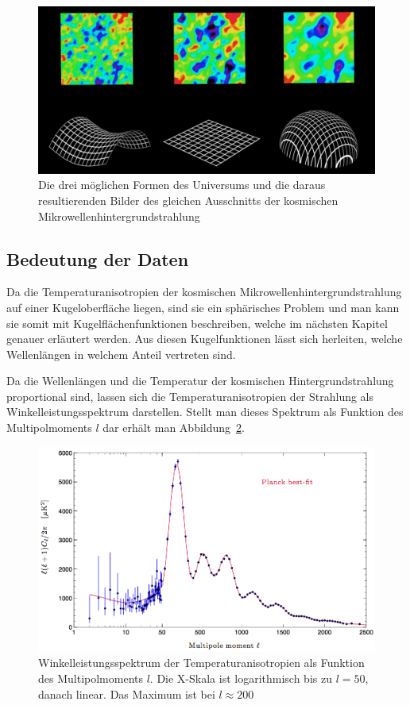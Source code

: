 \begin{figure}
	\includegraphics[width=\linewidth]{cmb/images/universe_shapes.jpg}
	\caption{Die drei möglichen Formen des Universums und die daraus 
		resultierenden Bilder des gleichen Ausschnitts der kosmischen
		Mikrowellenhintergrundstrahlung}
	\label{fig:universe_shapes}
\end{figure}

\subsection{Bedeutung der Daten\label{subsec:cmb:data-meaning}}
Da die Temperaturanisotropien der kosmischen Mikrowellenhintergrundstrahlung auf einer
Kugeloberfläche liegen, sind sie ein sphärisches Problem und man kann sie somit mit 
Kugelflächenfunktionen beschreiben, welche im nächsten Kapitel genauer erläutert werden.
Aus diesen Kugelfunktionen lässt sich herleiten, welche Wellenlängen in welchem Anteil vertreten sind.

Da die Wellenlängen und die Temperatur der kosmischen Hintergrundstrahlung proportional sind, lassen sich die Temperaturanisotropien der Strahlung als Winkelleistungsspektrum darstellen.
Stellt man dieses Spektrum als Funktion des Multipolmoments $l$ dar erhält man 
Abbildung~\ref{fig:planck_spectrum}.

\begin{figure}
	\includegraphics[width=\linewidth]{cmb/images/mission_spectrum.png}
	\caption{Winkelleistungsspektrum der Temperaturanisotropien als Funktion 
	des Multipolmoments $l$.
	Die X-Skala ist logarithmisch bis zu $l = 50$, danach linear. Das Maximum 
	ist bei $l \approx 200$}
	\label{fig:planck_spectrum}
\end{figure}

